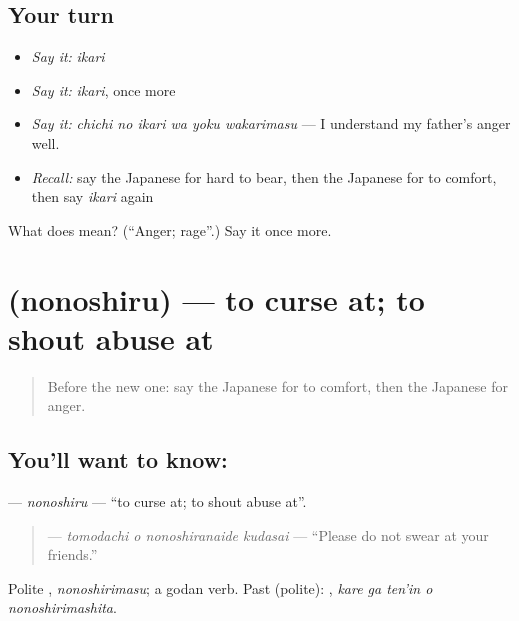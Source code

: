 \subsection*{Your turn}
\begin{itemize}
\raggedright
  \item \emph{Say it:} \emph{ikari}
  \item \emph{Say it:} \emph{ikari}, once more
  \item \emph{Say it:} \emph{chichi no ikari wa yoku wakarimasu} — I understand my father's anger well.
  \item \emph{Recall:} say the Japanese for hard to bear, then the Japanese for to comfort, then say \emph{ikari} again
\end{itemize}

\begin{tcolorbox}[breakable,colback=teal!4,colframe=teal!35!black,title={Before you move on}]
What does  mean? (\textquotedblleft{}Anger; rage\textquotedblright{}.) Say it once more.
\end{tcolorbox}
\section[\texorpdfstring{\ja{ののしる} (nonoshiru)}{ののしる (nonoshiru)}]{ (nonoshiru) — to curse at; to shout abuse at}

\label{lesson:JA-C430-nonoshiru}



\begin{quote}
Before the new one: say the Japanese for to comfort, then the Japanese for anger.
\end{quote}

\subsection*{You'll want to know: }
\textbf{} — \emph{nonoshiru} — \textquotedblleft{}to curse at; to shout abuse at\textquotedblright{}.

\begin{quote}
\textbf{  } — \emph{tomodachi o nonoshiranaide kudasai} — \textquotedblleft{}Please do not swear at your friends.\textquotedblright{}
\end{quote}

Polite \textbf{}, \emph{nonoshirimasu}; a godan verb. Past (polite): \textbf{  }, \emph{kare ga ten'in o nonoshirimashita}.

